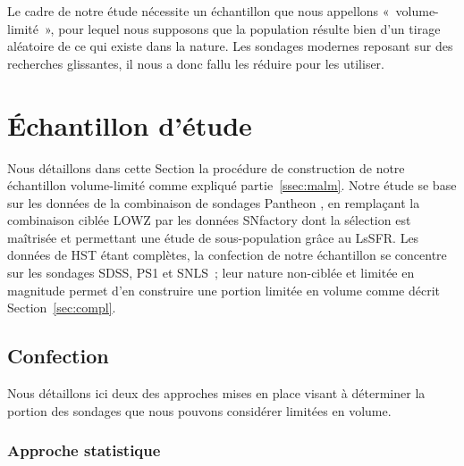 \documentclass[../main/main.tex]{subfiles}
\begin{document}
Le cadre de notre étude nécessite un échantillon que nous appellons
«~volume-limité~», pour lequel nous supposons que la population résulte bien
d'un tirage aléatoire de ce qui existe dans la nature. Les sondages modernes
reposant sur des recherches glissantes, il nous a donc fallu les réduire pour
les utiliser.

\section{Échantillon d'étude}\label{sec:sample}

Nous détaillons dans cette Section la procédure de construction de notre
échantillon volume-limité comme expliqué partie~\ref{ssec:malm}. Notre étude se
base sur les données de la combinaison de sondages Pantheon \citep{scolnic2018},
en remplaçant la combinaison ciblée LOWZ par les données SNfactory dont la
sélection est maîtrisée et permettant une étude de sous-population grâce au
LsSFR. Les données de HST étant complètes, la confection de notre échantillon se
concentre sur les sondages SDSS, PS1 et SNLS~; leur nature non-ciblée et limitée
en magnitude permet d'en construire une portion limitée en volume comme décrit
Section~\ref{sec:compl}.

\subsection{Confection}\label{ssec:cuts}

Nous détaillons ici deux des approches mises en place visant à déterminer la
portion des sondages que nous pouvons considérer limitées en volume.

\subsubsection{Approche statistique}\label{sssec:baserate}
\end{document}

